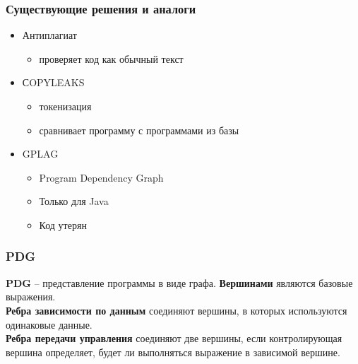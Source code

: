 \documentclass[10pt]{beamer}
\begin{document}
\begin{frame}[fragile]\frametitle{Существующие решения и аналоги}
	\begin{itemize}
		\item Антиплагиат
		\begin{itemize}
			\item проверяет код как обычный текст
		\end{itemize}
		\item СOPYLEAKS
		\begin{itemize}
			\item токенизация
			\item сравнивает программу с программами из базы
		\end{itemize}
		\item GPLAG
		\begin{itemize}
			\item Program Dependency Graph
			\item Только для Java
			\item Код утерян
		\end{itemize}
	\end{itemize}
\end{frame}

\begin{frame}\frametitle{PDG}
	\begin{definition}
		\textbf{PDG} -- представление программы в виде графа. \textbf{Вершинами} являются базовые выражения. \\
		\textbf{Ребра зависимости по данным} соединяют вершины, в которых используются одинаковые данные. \\
		\textbf{Ребра передачи управления} соединяют две вершины, если контролирующая вершина определяет, будет ли выполняться выражение в зависимой вершине.
	\end{definition}
\end{frame}
\end{document}
